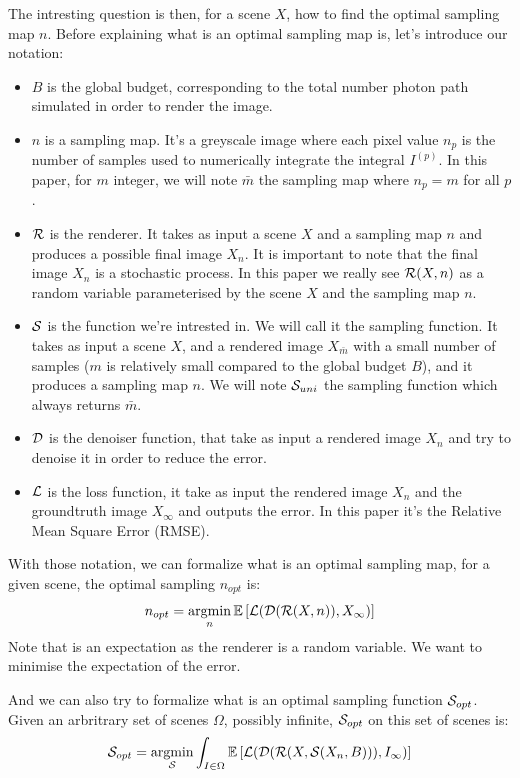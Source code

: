 \documentclass{classeENS}
\begin{document}
\par The intresting question is then, for a scene $X$, how to find the optimal
sampling map $n$. Before explaining what is an optimal sampling map is, let's introduce 
our notation:
\begin{itemize}
    \item $B$ is the global budget, corresponding to the total number photon path simulated
    in order to render the image.
    \item $n$ is a sampling map. It's a greyscale image where each pixel value $n_p$ is the 
    number of samples used to numerically integrate the integral $I^{(p)}$. 
    In this paper, for $m$ integer, we will note $\bar m$ the sampling map 
    where $n_p = m$ for all $p$.
    \item $\mathcal R$ is the renderer. It takes as input a scene $X$ and a sampling map 
    $n$ and produces a possible final image $X_n$. It is important to note that 
    the final image $X_n$ is a stochastic process. In this paper we really see 
    $\mathcal R(X,n)$ as a random variable parameterised by the scene $X$ and the sampling 
    map $n$.
    \item $\mathcal S$ is the function we're intrested in. We will call it the sampling function. 
    It takes as input a scene $X$, and a rendered image $X_{\bar m}$ with a small number 
    of samples ($m$ is relatively small compared to the global budget $B$), and it 
    produces a sampling map $n$. We will note $\mathcal S_{uni}$ the sampling function 
    which always returns $\bar m$.
    \item $\mathcal D$ is the denoiser function, that take as input a rendered image $X_n$ and try to
    denoise it in order to reduce the error.
    \item $\mathcal L$ is the loss function, it take as input the rendered image $X_n$ and the groundtruth 
    image $X_\infty$ and outputs the error. In this paper it's the Relative Mean Square Error (RMSE).
\end{itemize}
With those notation, we can formalize what is an optimal sampling map, for a given scene, 
the optimal sampling $n_{opt}$ is:
\begin{equation}
    \label{eq:0}
    n_{opt} = \operatorname*{argmin}_{n} \mathbb E \left [ \mathcal L (\mathcal D (\mathcal R(X, n)), X_\infty) \right ]
\end{equation}
Note that is an expectation as the renderer is a random variable. We want to minimise the 
expectation of the error.

\par And we can also try to formalize what is an optimal sampling function $\mathcal S_{opt}$.
Given an arbritrary set of scenes $\Omega$, possibly infinite, $\mathcal S_{opt}$ on this set of 
scenes is:
\begin{equation}
    \label{eq:1}
    \mathcal S_{opt} = \operatorname*{argmin}_{\mathcal S} \int_{I\in\Omega} \mathbb E \left [ \mathcal L (\mathcal D (\mathcal R(X, \mathcal S(X_n, B))), I_\infty) \right ]
\end{equation}
\end{document}
